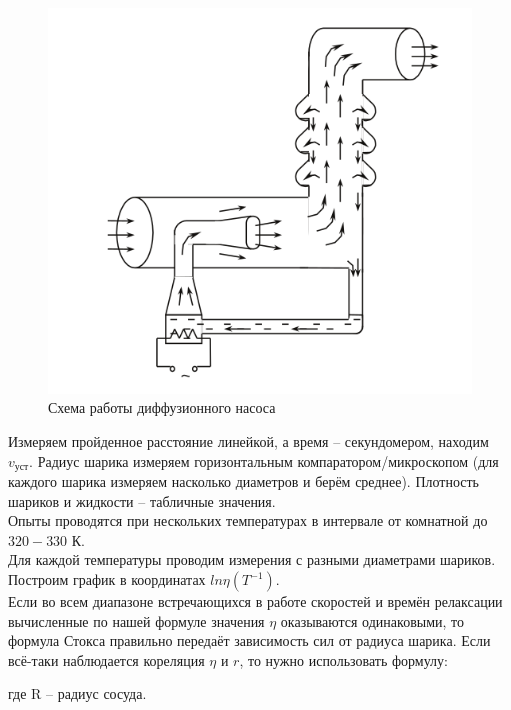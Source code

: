 \documentclass[11pt,a4paper]{article}
\begin{document}
\begin{figure}[h!]
  \includegraphics*[width=\textwidth]{ust3.png}
  \caption{Схема работы диффузионного насоса} 
  \label{fig:ust3}
\end{figure}

Измеряем пройденное расстояние линейкой, а время -- секундомером,
находим $v_\text{уст}$. Радиус шарика измеряем горизонтальным
компаратором/микроскопом (для каждого шарика измеряем насколько диаметров и берём среднее).
Плотность шариков и жидкости -- табличные значения.\\
Опыты проводятся при нескольких температурах в интервале от
комнатной до $320-330$ К.\\
Для каждой температуры проводим измерения с разными диаметрами шариков.\\
Построим график в координатах $ln\eta (T^{-1})$.\\
Если во всем диапазоне встречающихся в работе 
скоростей и времён релаксации вычисленные по нашей формуле
значения $\eta$ оказываются одинаковыми, то формула Стокса правильно
передаёт зависимость сил от радиуса шарика.
Если всё-таки наблюдается кореляция $\eta$ и $r$, то нужно использовать формулу:
\begin{center}{
  }\end{center}
где R --  радиус сосуда.
  
\end{document}
